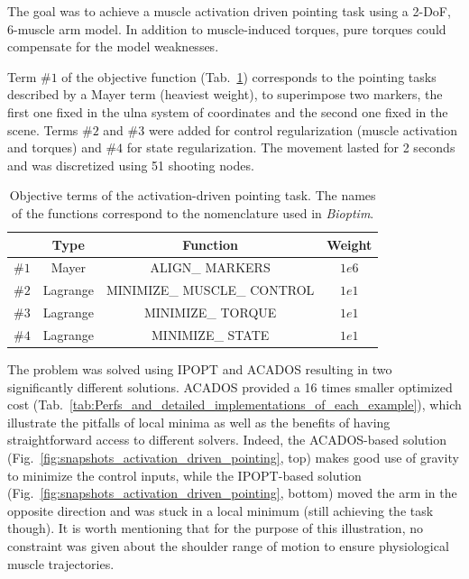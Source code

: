 The goal was to achieve a muscle activation driven pointing task using a 2-DoF, 6-muscle arm model. 
In addition to muscle-induced torques, pure torques could compensate for the model weaknesses.

Term $\#1$ of the objective function (Tab.~\ref{tab:Muscle_activation_driven_pointing_task}) corresponds to the pointing tasks described by a Mayer term (heaviest weight), to superimpose two markers, the first one fixed in the ulna system of coordinates and the second one fixed in the scene.
Terms $\#2$ and $\#3$ were added for control regularization (muscle activation and torques) and $\#4$ for state regularization. 
The movement lasted for 2 seconds and was discretized using 51 shooting nodes.
%

%
\begin{table}[h!]
\caption{\small Objective terms of the activation-driven pointing task. The names of the functions correspond to the nomenclature used in \textit{Bioptim}.}
\label{tab:Muscle_activation_driven_pointing_task}
\centering
\begin{tabular}{c c c c}
\toprule 
& Type & Function & Weight \\ 
\midrule
$\#1$ & Mayer & ALIGN\_ MARKERS & $1e6$ \\ 
\midrule
$\#2$ & Lagrange & MINIMIZE\_ MUSCLE\_ CONTROL & $1e1$ \\ 
\midrule
$\#3$ & Lagrange & MINIMIZE\_ TORQUE & $1e1$ \\ 
\midrule
$\#4$ & Lagrange & MINIMIZE\_ STATE & $1e1$ \\
\bottomrule
\end{tabular}
\end{table}
%

%
The problem was solved using IPOPT and ACADOS resulting in two significantly different solutions.
ACADOS provided a 16 times smaller optimized cost (Tab.~\ref{tab:Perfs_and_detailed_implementations_of_each_example}), which illustrate the pitfalls of local minima as well as the benefits of having straightforward access to different solvers.  
Indeed, the ACADOS-based solution (Fig.~\ref{fig:snapshots_activation_driven_pointing}, top) makes good use of gravity to minimize the control inputs, while the IPOPT-based solution (Fig.~\ref{fig:snapshots_activation_driven_pointing}, bottom) moved the arm in the opposite direction and was stuck in a local minimum (still achieving the task though). 
It is worth mentioning that for the purpose of this illustration, no constraint was given about the shoulder range of motion to ensure physiological muscle trajectories. 

